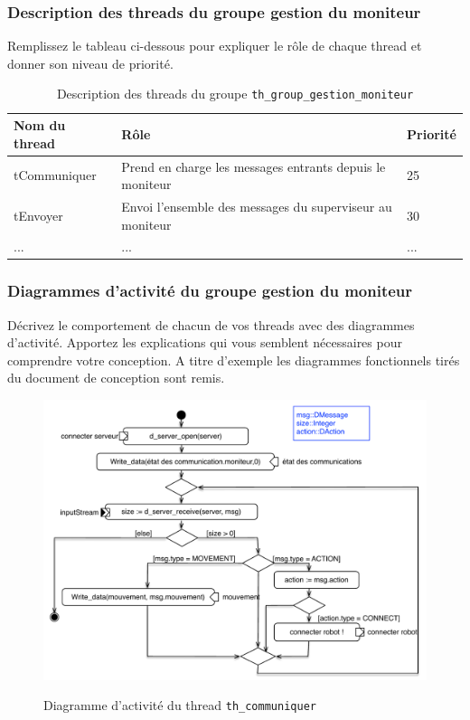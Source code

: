 \documentclass[11pt, a4paper]{paper}
\begin{document}
\subsubsection{Description des threads  du groupe gestion du moniteur}
{\color{red} Remplissez le tableau ci-dessous pour expliquer le rôle de chaque thread et donner son niveau de priorité.}


\begin{table}[htp]
\caption{Description des threads du groupe {\tt th\_group\_gestion\_moniteur}}
\begin{center}
\begin{tabular}{|p{3cm}|p{8.5cm}|p{2cm}|}
\hline
\bf Nom du thread &	\bf Rôle &	\bf Priorité \\
\hline
\hline
\color{blue}tCommuniquer	& \color{blue}Prend en charge les messages entrants depuis le moniteur & \color{blue}25\\
\hline
\color{blue}tEnvoyer	& \color{blue}Envoi l'ensemble des messages du superviseur au moniteur & \color{blue}30\\
\hline
\color{blue}... &	\color{blue}... &	\color{blue}...\\
\hline
\end{tabular}
\end{center}
\label{tab:gt_moniteur}
\end{table}%

\subsubsection{Diagrammes d'activité  du groupe gestion du moniteur}
{\color{red}Décrivez le comportement de chacun de vos threads avec des diagrammes d'activité. Apportez les explications qui vous semblent nécessaires pour comprendre votre conception. A titre d'exemple les diagrammes fonctionnels tirés du document de conception sont remis.}

\begin{figure}[htbp]
\label{fig:act_communiquer}
\begin{center}
{\includegraphics[scale=.5]{./figures-pdf/act_communiquer}}
{\caption{Diagramme d'activité du thread {\tt th\_communiquer}}}
\end{center}
\end{figure}
\FloatBarrier
\end{document}

